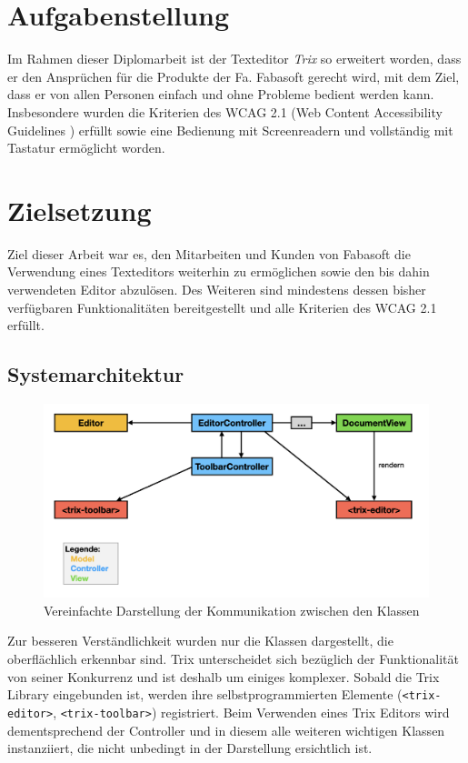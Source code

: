 \section{Aufgabenstellung}
Im Rahmen dieser Diplomarbeit ist der Texteditor {\em{Trix}} so erweitert worden, dass er den Ansprüchen für die Produkte der Fa. Fabasoft gerecht wird, mit dem Ziel, dass er von allen Personen einfach und ohne Probleme bedient werden kann. Insbesondere wurden die Kriterien des WCAG 2.1 (Web Content Accessibility Guidelines \cite{wcag_2_1_2018}) erfüllt sowie eine Bedienung mit Screenreadern und vollständig mit Tastatur ermöglicht worden.

\section{Zielsetzung}
Ziel dieser Arbeit war es, den Mitarbeiten und Kunden von Fabasoft die Verwendung eines Texteditors weiterhin zu ermöglichen sowie den bis dahin verwendeten Editor abzulösen. Des Weiteren sind mindestens dessen bisher verfügbaren Funktionalitäten bereitgestellt und alle Kriterien des WCAG 2.1 erfüllt.

\subsection{Systemarchitektur}
\begin{figure}[H]
\begin{center}
	\includegraphics[scale=.4]{images/sysarch.png}
\end{center}
	\caption{Vereinfachte Darstellung der Kommunikation zwischen den Klassen}
\end{figure}

Zur besseren Verständlichkeit wurden nur die Klassen dargestellt, die oberflächlich erkennbar sind. Trix unterscheidet sich bezüglich der Funktionalität von seiner Konkurrenz und ist deshalb um einiges komplexer. Sobald die Trix Library eingebunden ist, werden ihre selbstprogrammierten Elemente (\texttt{<trix-editor>}, \texttt{<trix-toolbar>}) registriert. Beim Verwenden eines Trix Editors wird dementsprechend der Controller und in diesem alle weiteren wichtigen Klassen instanziiert, die nicht unbedingt in der Darstellung ersichtlich ist. 

